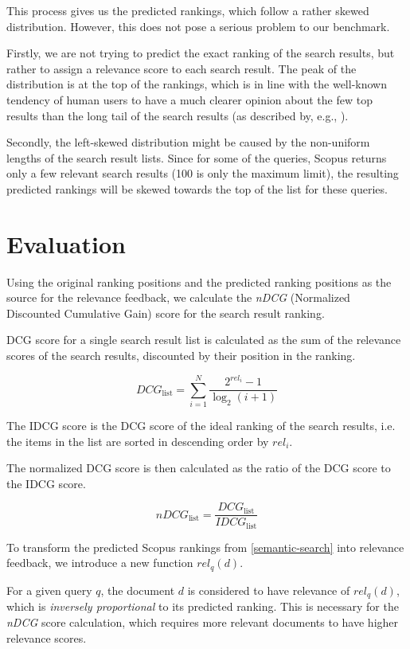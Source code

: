 This process gives us the predicted rankings, which follow a rather skewed distribution. 
However, this does not pose a serious problem to our benchmark.

Firstly, we are not trying to predict the exact ranking of the search results, but rather to assign a relevance score to each search result. 
The peak of the distribution is at the top of the rankings, 
which is in line with the well-known tendency of human users 
to have a much clearer opinion about the few top results than the long tail of the search results (as described by, e.g., \cite{9357332}).

Secondly, the left-skewed distribution might be caused by the non-uniform lengths of the search result lists. 
Since for some of the queries, Scopus returns only a few relevant search results (100 is only the maximum limit), 
the resulting predicted rankings will be skewed towards the top of the list for these queries.

\section{Evaluation}

Using the original ranking positions and the predicted ranking positions as the source for the 
relevance feedback, we calculate the \textit{nDCG} (Normalized Discounted Cumulative Gain) score for the 
search result ranking.

DCG score for a single search result list is calculated as the sum of the relevance scores of the search results, discounted by their position in the ranking.

$$
DCG_\text{list} = \sum_{i=1}^{N} \frac{2^{rel_i} - 1}{\log_2(i + 1)}
$$

The IDCG score is the DCG score of the ideal ranking of the search results, i.e. the items in the list are sorted in descending order by $rel_i$.

The normalized DCG score is then calculated as the ratio of the DCG score to the IDCG score.

$$
nDCG_{\text{list}} = \frac{DCG_\text{list}}{IDCG_\text{list}}
$$

To transform the predicted Scopus rankings from \ref{semantic-search} into relevance feedback, 
we introduce a new function $rel_q(d)$.

For a given query $q$, the document $d$ is considered to have relevance of $rel_q(d)$, 
which is \textit{inversely proportional} to its predicted ranking. 
This is necessary for the \textit{nDCG} score calculation, which requires more relevant documents 
to have higher relevance scores.

